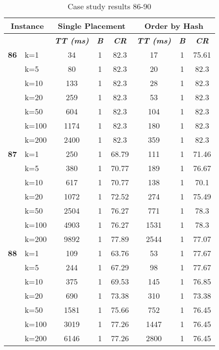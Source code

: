     \begin{table}[htbp]
    \caption{Case study results 86-90}
    \centering
    \begin{tabular}{|l|l|c|c|c|c|c|c|}
    \hline
    \multicolumn{ 2}{|c|}{\textbf{Instance}} & \multicolumn{ 3}{c|}{\textbf{Single Placement}} & \multicolumn{ 3}{c|}{\textbf{Order by Hash}} \\ \hline
    \multicolumn{ 2}{|l|}{} & \textbf{\textit{TT (ms)}} & \textbf{\textit{B}} & \textbf{\textit{CR}} & \textbf{\textit{TT (ms)}} & \textbf{\textit{B}} & \textbf{\textit{CR}} \\ \hline
    \multicolumn{1}{|r|}{\textbf{86}} & k=1 & 34 & 1 & 82.3 & 17 & 1 & 75.61 \\ 
     & k=5 & 80 & 1 & 82.3 & 20 & 1 & 82.3 \\ 
     & k=10 & 133 & 1 & 82.3 & 28 & 1 & 82.3 \\ 
     & k=20 & 259 & 1 & 82.3 & 53 & 1 & 82.3 \\ 
     & k=50 & 604 & 1 & 82.3 & 104 & 1 & 82.3 \\ 
     & k=100 & 1174 & 1 & 82.3 & 180 & 1 & 82.3 \\ 
     & k=200 & 2400 & 1 & 82.3 & 359 & 1 & 82.3 \\ \hline
    \multicolumn{1}{|r|}{\textbf{87}} & k=1 & 250 & 1 & 68.79 & 111 & 1 & 71.46 \\ 
     & k=5 & 380 & 1 & 70.77 & 189 & 1 & 76.67 \\ 
     & k=10 & 617 & 1 & 70.77 & 138 & 1 & 70.1 \\ 
     & k=20 & 1072 & 1 & 72.52 & 274 & 1 & 75.49 \\ 
     & k=50 & 2504 & 1 & 76.27 & 771 & 1 & 78.3 \\ 
     & k=100 & 4903 & 1 & 76.27 & 1531 & 1 & 78.3 \\ 
     & k=200 & 9892 & 1 & 77.89 & 2544 & 1 & 77.07 \\ \hline
    \multicolumn{1}{|r|}{\textbf{88}} & k=1 & 109 & 1 & 63.76 & 53 & 1 & 77.67 \\ 
     & k=5 & 244 & 1 & 67.29 & 98 & 1 & 77.67 \\ 
     & k=10 & 375 & 1 & 69.53 & 145 & 1 & 76.85 \\ 
     & k=20 & 690 & 1 & 73.38 & 310 & 1 & 73.38 \\ 
     & k=50 & 1581 & 1 & 75.66 & 752 & 1 & 76.45 \\ 
     & k=100 & 3019 & 1 & 77.26 & 1447 & 1 & 76.45 \\ 
     & k=200 & 6146 & 1 & 77.26 & 2800 & 1 & 76.45 \\ \hline

\end{tabular}
\end{table}
